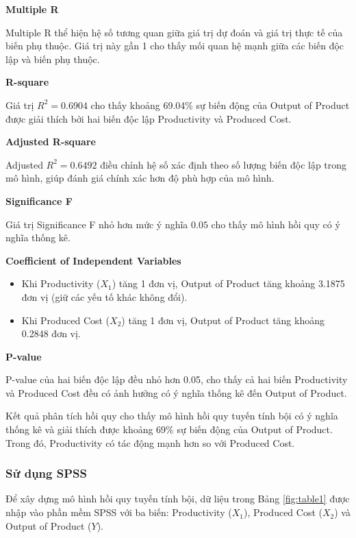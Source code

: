 
\textbf{Multiple R}

Multiple R thể hiện hệ số tương quan giữa giá trị dự đoán và giá trị thực tế
của biến phụ thuộc. Giá trị này gần 1 cho thấy mối quan hệ mạnh giữa
các biến độc lập và biến phụ thuộc.

\textbf{R-square}

Giá trị $R^2 = 0.6904$ cho thấy khoảng 69.04\% sự biến động của
Output of Product được giải thích bởi hai biến độc lập
Productivity và Produced Cost.

\textbf{Adjusted R-square}

Adjusted $R^2 = 0.6492$ điều chỉnh hệ số xác định theo số lượng biến
độc lập trong mô hình, giúp đánh giá chính xác hơn độ phù hợp của mô hình.

\textbf{Significance F}

Giá trị Significance F nhỏ hơn mức ý nghĩa $0.05$ cho thấy
mô hình hồi quy có ý nghĩa thống kê.

\textbf{Coefficient of Independent Variables}

\begin{itemize}
\item Khi Productivity ($X_1$) tăng 1 đơn vị, Output of Product tăng
khoảng 3.1875 đơn vị (giữ các yếu tố khác không đổi).
\item Khi Produced Cost ($X_2$) tăng 1 đơn vị, Output of Product tăng
khoảng 0.2848 đơn vị.
\end{itemize}

\textbf{P-value}

P-value của hai biến độc lập đều nhỏ hơn 0.05,
cho thấy cả hai biến Productivity và Produced Cost đều có
ảnh hưởng có ý nghĩa thống kê đến Output of Product.


Kết quả phân tích hồi quy cho thấy mô hình hồi quy tuyến tính bội
có ý nghĩa thống kê và giải thích được khoảng 69\% sự biến động
của Output of Product. Trong đó, Productivity có tác động mạnh hơn
so với Produced Cost.


\subsubsection{Sử dụng SPSS}

Để xây dựng mô hình hồi quy tuyến tính bội, dữ liệu trong Bảng \ref{fig:table1}
được nhập vào phần mềm SPSS với ba biến: Productivity ($X_1$),
Produced Cost ($X_2$) và Output of Product ($Y$).

